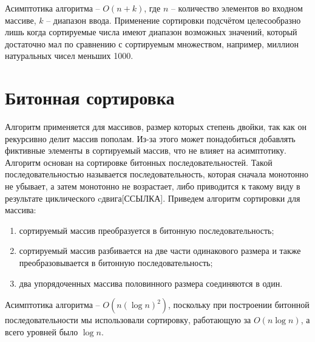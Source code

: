 Асимптотика алгоритма -- $O(n + k)$, где $n$ -- количество элементов во входном массиве, $k$ -- диапазон ввода. Применение сортировки подсчётом целесообразно лишь когда сортируемые числа имеют диапазон возможных значений, который достаточно мал по сравнению с сортируемым множеством, например, миллион натуральных чисел меньших 1000.


\section{Битонная сортировка}

Алгоритм применяется для массивов, размер которых степень двойки, так как он рекурсивно делит массив пополам. Из-за этого может понадобиться добавлять фиктивные элементы в сортируемый массив, что не влияет на асимптотику. Алгоритм основан на сортировке битонных последовательностей. Такой последовательностью называется последовательность, которая сначала монотонно не убывает, а затем монотонно не возрастает, либо приводится к такому виду в результате циклического cдвига[ССЫЛКА]. Приведем алгоритм сортировки для массива:
\begin{enumerate}
	\item сортируемый массив преобразуется в битонную последовательность;
	\item сортируемый массив разбивается на две части одинакового размера и также преобразовывается в битонную последовательность;
	\item два упорядоченных массива половинного размера соединяются в один.
\end{enumerate}

Асимптотика алгоритма -- $O(n (\log n)^{2})$, поскольку при построении битонной последовательности мы использовали сортировку, работающую за $O(n\log n)$, а всего уровней было $\log n$. 